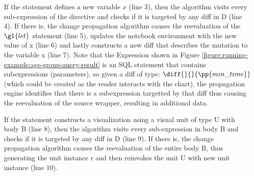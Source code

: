 \begin{compactitem}

\item If the statement defines a new variable $x$ (line 3), then the algorithm visits every sub-expression of the  directive and checks if it is targeted by any diff in D (line 4). If there is, the change propagation algorithm causes the reevaluation of the $\gl{let}$ statement (line 5), updates the notebook environment with the new value of x (line 6) and lastly constructs a new diff that describes the mutation to the variable x (line 7). Note that the Expression shown in Figure \ref{figure:running-example:age-group-query-result} is an SQL statement that contains subexpressions (parameters), so given a diff of type: $\diff{}{}{\pp{min\_time}}$ (which could be created as the reader interacts with the chart), the propagation engine identifies that there is a subexpression targetted by that diff thus causing the reevaluation of the source wrapper, resulting in additional data. 

\item If the statement constructs a visualization using a visual unit of type U with body B (line 8), then the algorithm visits every sub-expression in body B and checks if it is targeted by any diff in D (line 9). If there is, the change propagation algorithm causes the reevaluation of the entire body B, thus generating the unit instance r and then reinvokes the unit U with new unit instance (line 10).




\end{compactitem}
